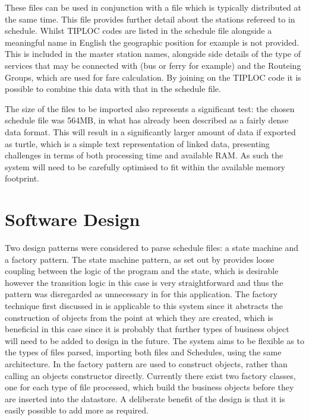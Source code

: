 These files can be used in conjunction with a  file which is typically distributed at the same time. This file provides further detail about the stations refereed to in schedule. Whilst TIPLOC codes are listed in the schedule file alongside a meaningful name in English the geographic position for example is not provided. This is included in the master station names, alongside side details of the type of services that may be connected with (bus or ferry for example) and the Routeing Groups, which are used for fare calculation. By joining on the TIPLOC code it is possible to combine this data with that in the schedule file.

The size of the files to be imported also represents a significant test: the chosen schedule file was 564MB, in what has already been described as a fairly dense data format. This will result in a significantly larger amount of data if exported as turtle, which is a simple text representation of linked data, presenting challenges in terms of both processing time and available RAM. As such the system will need to be carefully optimised to fit within the available memory footprint.

 \section{Software Design}
 Two design patterns were considered to parse schedule files: a state machine and a factory pattern. The state machine pattern, as set out by \cite{Shalyto2006} provides loose coupling between the logic of the program and the state, which is desirable however the transition logic in this case is very straightforward and thus the pattern was disregarded as unnecessary in for this application. The factory technique first discussed in \cite{Gamma2002} is applicable to this system since it abstracts the construction of objects from the point at which they are created, which is beneficial in this case since it is probably that further types of business object will need to be added to design in the future. The system aims to be flexible as to the types of files parsed, importing both  files and Schedules, using the same architecture. In the factory pattern  are used to construct objects, rather than calling an objects constructor directly. Currently there exist two factory classes, one for each type of file processed, which build the business objects before they are inserted into the datastore. A deliberate benefit of the design is that it is easily possible to add more as required.

